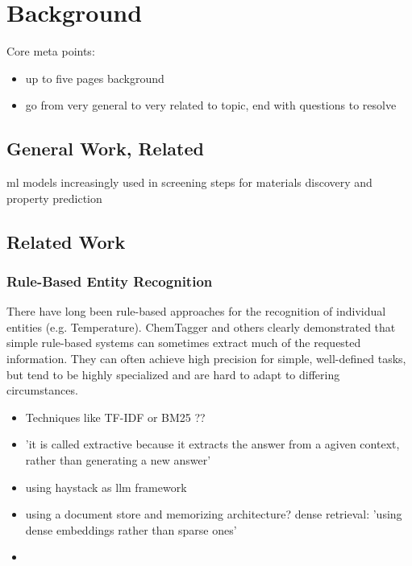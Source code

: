 \chapter{Background}\label{chap:background}
Core meta points:
\begin{itemize}
    \item up to five pages background
    \item go from very general to very related to topic, end with questions to resolve
\end{itemize}

\section{General Work, Related}\label{sec:general}
ml models increasingly used in screening steps for materials discovery and property prediction

\section{Related Work}\label{sec:related}

\subsection{Rule-Based Entity Recognition}\label{sub:ER}
There have long been rule-based approaches for the recognition of individual
entities (e.g. Temperature). ChemTagger \cite{hawizy_chemicaltagger_2011}
and others \cite{beard_comparative_2019, huang_database_2020}
clearly demonstrated that simple rule-based systems can sometimes extract much
of the requested information. They can often
achieve high precision for simple, well-defined
tasks, but tend to be highly specialized and
are hard to adapt to differing circumstances.




\begin{itemize}
    \item Techniques like TF-IDF or BM25 ??
    \item 'it is called extractive because it extracts the answer from a agiven
        context, rather than generating a new answer'
    \item using haystack as llm framework
    \item using a document store and memorizing architecture? dense retrieval:
        'using dense embeddings rather than sparse ones'
    \item
\end{itemize}

